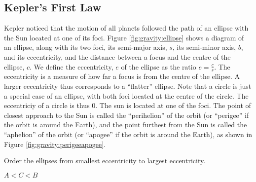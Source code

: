 \subsection{Kepler's First Law}
Kepler noticed that the motion of all planets followed the path of an ellipse with the Sun located at one of its foci. Figure \ref{fig:gravity:ellipse} shows a diagram of an ellipse, along with its two foci, its semi-major axis, $s$, its semi-minor axis, $b$, and its eccentricity, and the distance between a focus and the centre of the ellipse, $c$. We define the eccentricity, $e$ of the ellipse as the ratio $e=\frac{c}{s}$. The eccentricity is a measure of how far a focus is from the centre of the ellipse. A larger eccentricity thus corresponds to a ``flatter'' ellipse. Note that a circle is just a special case of an ellipse, with both foci located at the centre of the circle. The eccentriciy of a circle is thus 0.
The sun is located at one of the foci. The point of closest approach to the Sun is called the ``perihelion'' of the orbit (or ``perigee'' if the orbit is around the Earth), and the point furthest from the Sun is called the ``aphelion'' of the orbit (or ``apogee'' if the orbit is around the Earth), as shown in Figure \ref{fig:gravity:perigeeapogee}.
\begin{checkpoint} Order the ellipses from smallest eccentricity to largest eccentricity.
\begin{answer}
$A<C<B$
\end{answer}
\end{checkpoint}

